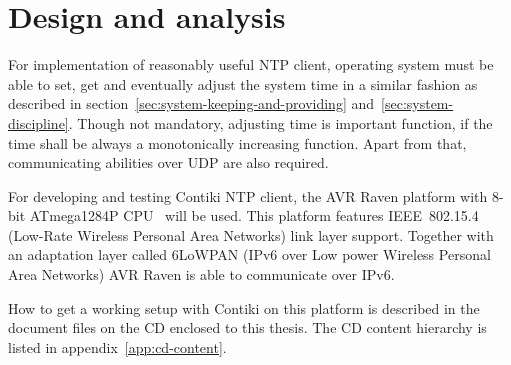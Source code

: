 
\chapter{Design and analysis}
For implementation of reasonably useful NTP client,
operating system must be able to set, get
and eventually adjust the system time in a similar fashion as
described in section~\ref{sec:system-keeping-and-providing} and~\ref{sec:system-discipline}.
Though not mandatory, adjusting time is important function,
if the time shall be always a monotonically increasing function.
Apart from that, communicating abilities over UDP are also required.

For developing and testing Contiki NTP client,
the AVR Raven platform with 8-bit ATmega1284P CPU~\cite{avr-datasheet} will be used.
This platform features IEEE~802.15.4 (Low-Rate Wireless Personal Area Networks) link layer support.
Together with an adaptation layer called 6LoWPAN (IPv6 over Low power Wireless Personal Area Networks)
AVR Raven is able to communicate over IPv6.

How to get a working setup with Contiki on this platform is described in
the document files on the CD enclosed to this thesis.
The CD content hierarchy is listed in appendix~\ref{app:cd-content}.




%

